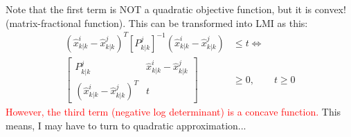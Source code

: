 \documentclass[letterpaper, 10 pt, conference]{ieeeconf}  %
\begin{document}
Note that the first term is NOT a quadratic objective function, but it is convex! (matrix-fractional function).
This can be transformed into LMI as this:
\begin{align*}
(\hat{x}^i_{k|k}-\hat{x}^j_{k|k})^T[P^j_{k|k}]^{-1}(\hat{x}^i_{k|k}-\hat{x}^j_{k|k})&\leq t \iff\\
\begin{bmatrix}
P^j_{k|k} & \hat{x}^i_{k|k}-\hat{x}^j_{k|k}\\
(\hat{x}^i_{k|k}-\hat{x}^j_{k|k})^T & t
\end{bmatrix}&\geq 0,\qquad t\geq 0
\end{align*}
\textcolor{red}{However, the third term (negative log determinant) is a concave function.}
This means, I may have to turn to quadratic approximation...
\end{document}
